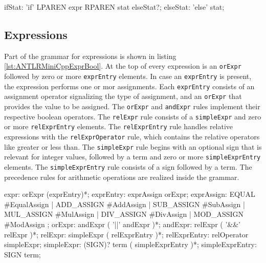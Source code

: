\begin{AntlrCode}[float,numbers=none,caption=If Statement rule  of the MiniC++ ANTLR grammar., label=lst:ANTLRMiniCppStatIf]
ifStat:      'if' LPAREN expr RPAREN stat elseStat?;
elseStat:    'else' stat;
\end{AntlrCode}



\subsection{Expressions}

Part of the grammar for expressions is shown in listing \ref{lst:ANTLRMiniCppExprBool}. At the top of every expression is an \texttt{orExpr} followed by zero or more \texttt{exprEntry} elements. In case an \texttt{exprEntry} is present, the expression performs one or mor assignments. Each \texttt{exprEntry} consists of an assignment operator signalizing the type of assignment, and an \texttt{orExpr} that provides the value to be assigned. The \verb|orExpr| and \verb|andExpr| rules implement their respective boolean operators. The \verb|relExpr| rule consists of a \verb|simpleExpr| and zero or more \verb|relExprEntry| elements. The \verb|relExprEntry| rule handles relative expressions with the \verb|relExprOperator| rule, which contains the relative operators like greater or less than. The \verb|simpleExpr| rule begins with an optional sign that is relevant for integer values, followed by a term and zero or more \verb|simpleExprEntry| elements. The \verb|simpleExprEntry| rule consists of a sign followed by a term. The precedence rules for arithmetic operations are realized inside the grammar.



\begin{AntlrCode}[float,numbers=none,caption=Expression rules for assignment and boolean operations of the MiniC++ ANTLR grammar., label=lst:ANTLRMiniCppExprBool]
expr:                 orExpr (exprEntry)*;
exprEntry:            exprAssign orExpr;
exprAssign:           EQUAL      #EqualAssign
                    | ADD_ASSIGN #AddAssign
                    | SUB_ASSIGN #SubAssign
                    | MUL_ASSIGN #MulAssign
                    | DIV_ASSIGN #DivAssign
                    | MOD_ASSIGN #ModAssign
                    ;
orExpr:             andExpr ( '||' andExpr )*;
andExpr:            relExpr ( '&&' relExpr )*;
relExpr:            simpleExpr
                    ( relExprEntry )*;
relExprEntry:       relOperator simpleExpr;
simpleExpr:         (SIGN)?
                    term ( simpleExprEntry )*;
simpleExprEntry:    SIGN term;
\end{AntlrCode}

